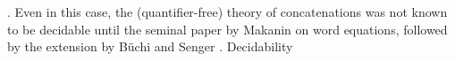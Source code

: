 . Even in this case, the (quantifier-free)
theory of concatenations was not known to be decidable until the seminal
paper by Makanin \cite{Makanin} on word equations, followed by the
extension by B\"{u}chi and Senger \cite{buchi}. Decidability 



